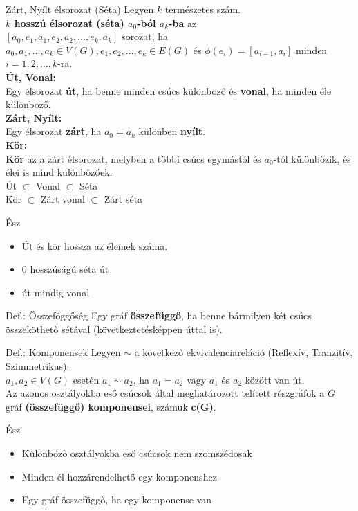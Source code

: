 \documentclass{beamer}
\begin{document}
\begin{frame}
\begin{block}{Zárt, Nyílt élsorozat (Séta)}
Legyen $k$ természetes szám.\\
\textbf{$k$ hosszú élsorozat (séta) $a_0$-ból $a_k$-ba} az\\
\smallskip
$[a_0, e_1, a_1, e_2, a_2, ..., e_k, a_k]$ sorozat, ha $a_0, a_1, ..., a_k \in V(G), e_1, e_2, ..., e_k \in E(G)$ és ${\phi}(e_i) = [a_{i - 1}, a_i]$ minden $i = 1, 2, ..., k$-ra.\\
\bigskip
\textbf{Út, Vonal:}\\
Egy élsorozat \textbf{út}, ha benne minden csúcs különböző és \textbf{vonal}, ha minden éle különboző.\\
\bigskip
\textbf{Zárt, Nyílt:}\\
Egy élsorozat \textbf{zárt}, ha $a_0 = a_k$ különben \textbf{nyílt}.\\
\bigskip
\textbf{Kör:}\\
\textbf{Kör} az a zárt élsorozat, melyben a többi csúcs egymástól és $a_0$-tól különbözik, és élei is mind különbözőek.\\
\bigskip
Út $\subset$ Vonal $\subset$ Séta\\
\medskip
Kör $\subset$ Zárt vonal $\subset$ Zárt séta
\end{block}
\begin{block}{Ész}
\begin{itemize}
\item Út és kör hossza az éleinek száma.
\item 0 hosszúságú séta út
\item út mindig vonal
\end{itemize}
\end{block}

\end{frame}

\begin{frame}
\begin{block}{Def.: Összeföggőség}
Egy gráf \textbf{összefüggő}, ha benne bármilyen két csúcs összeköthető sétával (következtetésképpen úttal is).
\end{block}
\begin{block}{Def.: Komponensek}
Legyen $\sim$ a következő ekvivalenciareláció (Reflexív, Tranzitív, Szimmetrikus):\\
\bigskip
$a_1, a_2 \in V(G)$ esetén $a_1 \sim a_2$, ha $a_1 = a_2$ vagy $a_1$ és $a_2$ között van út.\\
\bigskip
Az azonos osztályokba eső csúcsok által meghatározott telített részgráfok a $G$ gráf \textbf{(összefüggő) komponensei}, számuk \textbf{c(G)}.
\end{block}
\begin{block}{Ész}
\begin{itemize}
\item Különböző osztályokba eső csúcsok nem szomszédosak
\item Minden él hozzárendelhető egy komponenshez
\item Egy gráf összefüggő, ha egy komponense van
\end{itemize}
\end{block}
\end{frame}
\end{document}
